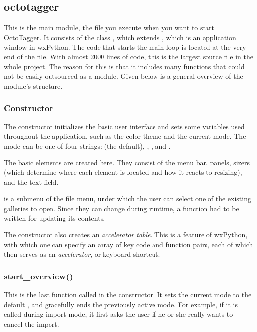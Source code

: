 \subsection{octotagger}
\def\kapitelautor{Erik Ritschl}

This is the main module, the file you execute when you want to start
OctoTagger. It consists of the class , which extends
, which is an application window in wxPython.
The code that starts the main loop is located at the very end of the file. %
With almost 2000 lines of code, this is the largest source file in the whole
project. The reason for this is that it includes many functions that could not
be easily outsourced as a module. Given below is a general overview of the
module's structure.

\subsubsection{Constructor}

The constructor initializes the basic user interface and sets some variables
used throughout the application, such as the color theme and the current mode.
The mode can be one of four strings:  (the default),
, , and .

The basic elements are created here. They consist of the menu bar, panels,
sizers (which determine where each element is located and how it reacts to
resizing), and the text field. %

 is a submenu of the file menu, under which the user can
select one of the existing galleries to open. Since they can change during
runtime, a function had to be written for updating its contents.

The constructor also creates an \emph{accelerator table}. This is a feature
of wxPython, with which one can specify an array of key code
and function pairs, each of which then serves as an \emph{accelerator}, or
keyboard shortcut.

\subsubsection{start\_overview()}

This is the last function called in the constructor. It sets the current mode
to the default , and gracefully ends the previously active
mode. For example, if it is called during import mode, it first asks the user
if he or she really wants to cancel the import.


